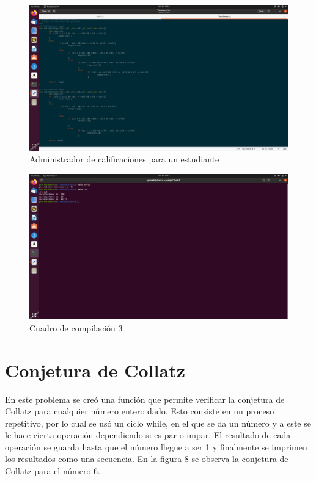 \documentclass[
  letterpaper, 
  maincolor=black,
  sectioncolor=black!90,
  subsectioncolor=black!70,
  itemtextcolor=black!40,
]{fortysecondscv}
\begin{document}
        \begin{figure}[H]
            \centering
            \includegraphics[trim= 0 30 580 0,clip,width=1.20\textwidth]{img/punto3.jpg}
            \caption{Administrador de calificaciones para un estudiante}
            \label{fig:my_label}
        \end{figure}
        \begin{figure}[H]
            \centering
            \includegraphics[trim= 30 550 800 30,clip,width=1.20\textwidth]{img/prueba3.jpg}
            \caption{Cuadro de compilación 3}
            \label{fig:my_label}
        \end{figure}
        
    \section{Conjetura de Collatz}
    En este problema se creó una función que permite verificar la conjetura de Collatz para cualquier número entero dado. Esto consiste en un proceso repetitivo, por lo cual se usó un ciclo while, en el que se da un número y a este se le hace cierta operación dependiendo si es par o impar. El resultado de cada operación se guarda hasta que el número llegue a ser 1 y finalmente se imprimen los resultados como una secuencia. En la figura 8 se observa la conjetura de Collatz para el número 6.
    
\end{document}
